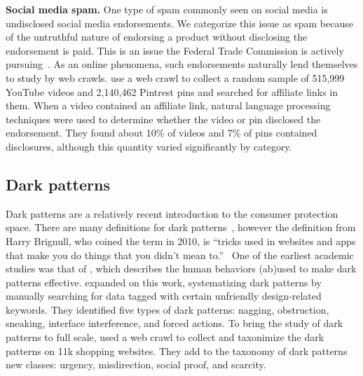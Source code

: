 \textbf{Social media spam.}
One type of spam commonly seen on social media is undisclosed social media endorsements. We categorize this issue as spam because of the untruthful nature of endorsing a product without disclosing the endorsement is paid. This is an issue the Federal Trade Commission is actively pursuing~\cite{ftc2021disclosures,ftc21notice}. As an online phenomena, such endorsements naturally lend themselves to study by web crawls. \citet{mathur2018endorsements} use a web crawl to collect a random sample of 515,999 YouTube videos and 2,140,462 Pintrest pins and searched for affiliate links in them. When a video contained an affiliate link, natural language processing techniques were used to determine whether the video or pin disclosed the endorsement. They found about 10\% of videos and 7\% of pins contained disclosures, although this quantity varied significantly by category.


\subsection{Dark patterns}

Dark patterns are a relatively recent introduction to the consumer protection space. There are many definitions for dark patterns~\cite{mathur2019dark}, however the definition from Harry Brignull, who coined the term in 2010, is ``tricks used in websites and apps that make you do things that you didn't mean to.''~\cite{darkpatternsorg} One of the earliest academic studies was that of \citet{greenberg2014dark}, which describes the human behaviors (ab)used to make dark patterns effective. \citet{gray2018dark} expanded on this work, systematizing dark patterns by manually searching for data tagged with certain unfriendly design-related keywords. They identified five types of dark patterns: nagging, obstruction, sneaking, interface interference, and forced actions. To bring the study of dark patterns to full scale, \citet{mathur2019dark} used a web crawl to collect and taxonimize the dark patterns on 11k shopping websites. They add to the taxonomy of dark patterns new classes: urgency, misdirection, social proof, and scarcity.


